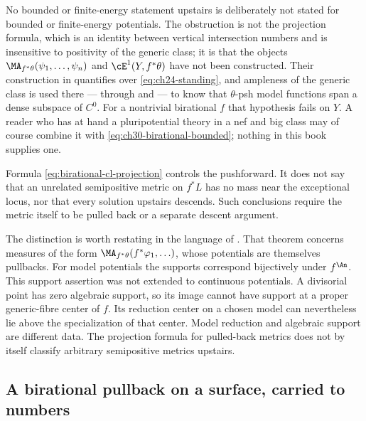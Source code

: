 \begin{warning}{No bounded or finite-energy statement upstairs}
 is deliberately not stated for
bounded or finite-energy potentials.  The obstruction is not the projection
formula, which is an identity between vertical intersection numbers and is
insensitive to positivity of the generic class; it is that the objects
$\MA_{f^*\theta}(\psi_1,\ldots,\psi_n)$ and $\cE^1(Y,f^*\theta)$ have
not been constructed.  Their construction in
 quantifies over
\eqref{eq:ch24-standing}, and ampleness of the generic class is used there
--- through  and
 --- to know that $\theta$-psh model
functions span a dense subspace of $C^0$.  For a nontrivial birational
$f$ that hypothesis fails on $Y$.  A reader who has at hand a
pluripotential theory in a nef and big class may of course combine it with
\eqref{eq:ch30-birational-bounded}; nothing in this book supplies one.
\end{warning}

\begin{remark}
\label{rem:ch30-exceptional-mass}
Formula \eqref{eq:birational-cl-projection} controls the pushforward.  It
does not say that an unrelated semipositive metric on $f^*L$ has no mass
near the exceptional locus, nor that every solution upstairs descends.
Such conclusions require the metric itself to be pulled back or a separate
descent argument.

The distinction is worth restating in the language of
.  That theorem concerns measures
of the form $\MA_{f^*\theta}(f^*\varphi_1,\ldots)$, whose potentials are
themselves pullbacks.  For model potentials the supports correspond bijectively under
$f^{\An}$.  This support assertion was not extended to continuous
potentials.  A divisorial point has zero algebraic support, so its
image cannot have support at a proper generic-fibre center of $f$.
Its reduction center on a chosen model can nevertheless lie above
the specialization of that center.  Model reduction and algebraic
support are different data.  The projection formula for pulled-back
metrics does not by itself classify arbitrary semipositive metrics
upstairs.
\end{remark}

\subsection{A birational pullback on a surface, carried to numbers}
\label{sec:ch30-birational-example}

